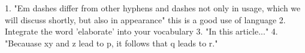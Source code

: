 1. "Em dashes differ from other hyphens and dashes not only in usage, which we will discuss shortly, but also in appearance" this is a good use of language
2. Integrate the word 'elaborate' into your vocabulary
3. "In this article..."
4. "Becauase xy and z lead to p, it follows that q leads to r."
